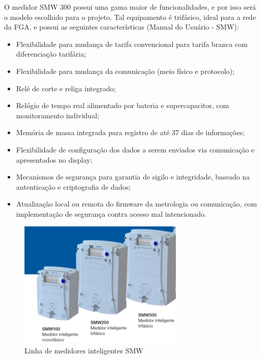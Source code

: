 O medidor SMW 300 possui uma gama maior de funcionalidades, e por isso será o modelo escolhido para o projeto. Tal equipamento é trifásico, ideal para a rede da FGA, e possui as seguintes características (Manual do Usuário - SMW): 
\begin{itemize}
\item Flexibilidade para mudança de tarifa convencional para tarifa branca com diferenciação tarifária;
\item Flexibilidade para mudança da comunicação (meio físico e protocolo);
\item Relé de corte e religa integrado;
\item Relógio de tempo real alimentado por bateria e supercapacitor, com monitoramento individual; 
\item Memória de massa integrada para registro de até 37 dias de informações;
\item Flexibilidade de configuração dos dados a serem enviados via comunicação e apresentados no display;
\item Mecanismos de segurança para garantia de sigilo e integridade, baseado na autenticação e criptografia de dados;
\item Atualização local ou remota do firmware da metrologia ou comunicação, com implementação de segurança contra acesso mal intencionado.
\end{itemize}
\begin{figure}[!h]
	\centering
	\includegraphics[width=0.7\textwidth]{figuras/medidoresInteligentesSMW.png}
	\caption{Linha de medidores inteligentes SMW}
	\label{fig:medidoresinteligentes}
\end{figure}

